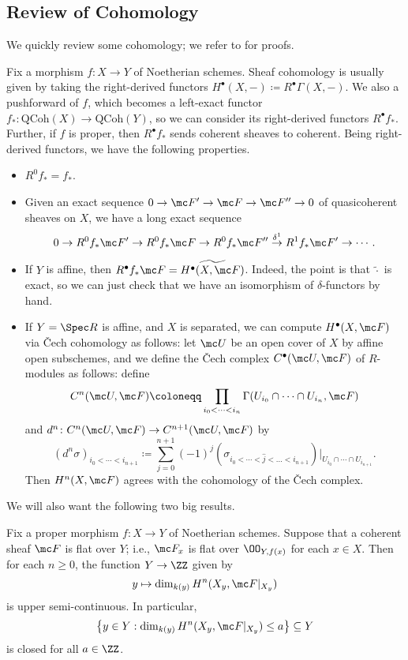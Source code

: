 \documentclass[../notes.tex]{subfiles}
\begin{document}
\subsection{Review of Cohomology}
We quickly review some cohomology; we refer to \cite[Chapter~III]{hartshorne} for proofs.

Fix a morphism $f\colon X\to Y$ of Noetherian schemes. Sheaf cohomology is usually given by taking the right-derived functors $H^\bullet(X,-)\coloneqq R^\bullet\Gamma(X,-)$. We also a pushforward of $f$, which becomes a left-exact functor $f_*\colon\mathrm{QCoh}(X)\to\mathrm{QCoh}(Y)$, so we can consider its right-derived functors $R^\bullet f_*$. Further, if $f$ is proper, then $R^\bullet f_*$ sends coherent sheaves to coherent. Being right-derived functors, we have the following properties.
\begin{itemize}
	\item $R^0f_*=f_*$.
	\item Given an exact sequence $0\to\mc F'\to\mc F\to\mc F''\to0$ of quasicoherent sheaves on $X$, we have a long exact sequence
	\[0\to R^0f_*\mc F'\to R^0f_*\mc F\to R^0f_*\mc F''\stackrel{\delta^1}\to R^1f_*\mc F'\to\cdots.\]
	\item If $Y$ is affine, then $R^\bullet f_*\mc F=\widetilde{H^\bullet(X,\mc F)}$. Indeed, the point is that $\widetilde\cdot$ is exact, so we can just check that we have an isomorphism of $\delta$-functors by hand.
	\item If $Y=\Spec R$ is affine, and $X$ is separated, we can compute $H^\bullet(X,\mc F)$ via \v Cech cohomology as follows: let $\mc U$ be an open cover of $X$ by affine open subschemes, and we define the \v Cech complex $C^\bullet(\mc U,\mc F)$ of $R$-modules as follows: define
	\[C^n(\mc U,\mc F)\coloneqq\prod_{i_0<\cdots<i_n}\Gamma(U_{i_0}\cap\cdots\cap U_{i_n},\mc F)\]
	and $d^n\colon C^n(\mc U,\mc F)\to C^{n+1}(\mc U,\mc F)$ by
	\[\left(d^n\sigma\right)_{i_0<\cdots<i_{n+1}}\coloneqq\sum_{j=0}^{n+1}(-1)^j(\sigma_{i_0<\cdots<\widehat j<\ldots<i_{n+1}})|_{U_{i_0}\cap\cdots\cap U_{i_{n+1}}}.\]
	Then $H^n(X,\mc F)$ agrees with the cohomology of the \v Cech complex.
\end{itemize}
We will also want the following two big results.
\begin{theorem}[Semicontinuity] \label{thm:semicont}
	Fix a proper morphism $f\colon X\to Y$ of Noetherian schemes. Suppose that a coherent sheaf $\mc F$ is flat over $Y$; i.e., $\mc F_x$ is flat over $\OO_{Y,f(x)}$ for each $x\in X$. Then for each $n\ge0$, the function $Y\to\ZZ$ given by
	\[y\mapsto\dim_{k(y)}H^n(X_y,\mc F|_{X_y})\]
	is upper semi-continuous. In particular,
	\[\left\{y\in Y:\dim_{k(y)}H^n(X_y,\mc F|_{X_y})\le a\right\}\subseteq Y\]
	is closed for all $a\in\ZZ$.
\end{theorem}
\end{document}
